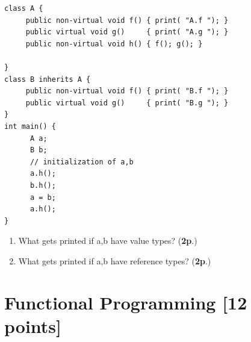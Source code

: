 \documentclass{article}
\begin{document}
\begin{enumerate}
{\small 
\begin{verbatim}
class A {
     public non-virtual void f() { print( "A.f "); }
     public virtual void g()     { print( "A.g "); }
     public non-virtual void h() { f(); g(); }
    
}
class B inherits A {
     public non-virtual void f() { print( "B.f "); }
     public virtual void g()     { print( "B.g "); }
}
int main() {
      A a;
      B b;
      // initialization of a,b
      a.h();
      b.h();
      a = b;
      a.h(); 
}
\end{verbatim}
}
\begin{enumerate}
\item What gets printed if a,b have value types?  (\textbf{2p}.)
\item What gets printed if a,b have reference types?  (\textbf{2p}.)
\end{enumerate}
\end{enumerate}

\newpage

\section{Functional Programming [12 points]}
\end{document}
